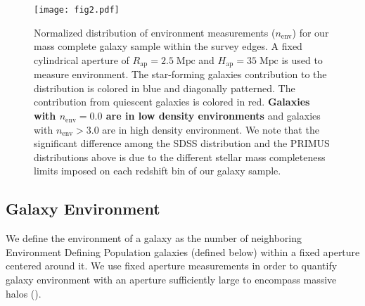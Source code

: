\documentclass{emulateapj}
\def \apradius{2.5}
\def \apheight{35}
\begin{document}
\begin{figure}
  \begin{center}
    \leavevmode
    \texttt{[image: fig2.pdf]}
    \caption{Normalized distribution of environment measurements ($n_{\mathrm{env}}$) for our mass complete galaxy sample within the survey edges. A fixed cylindrical aperture of $R_{\mathrm{ap}} =\apradius\;\mathrm{Mpc}$ and $H_{\mathrm{ap}} = \apheight\; \mathrm{Mpc}$ is used to measure environment. The star-forming galaxies contribution to the distribution is colored in blue and diagonally patterned. The contribution from quiescent galaxies is colored in red. {\bf Galaxies with $n_{\mathrm{env}} = 0.0$ are in low density environments} and galaxies with $n_{\mathrm{env}} > 3.0$ are in high density environment. We note that the significant difference among the SDSS distribution and the PRIMUS distributions above is due to the different stellar mass completeness limits imposed on each redshift bin of our galaxy sample.}      \label{fig:envcount}
    \end{center}
\end{figure}

\subsection{Galaxy Environment} \label{sec:environment}
We define the environment of a galaxy as the number of neighboring Environment Defining Population galaxies (defined below) within a fixed aperture centered around it. We use fixed aperture measurements in order to quantify galaxy environment with an aperture sufficiently large to encompass massive halos (\citealt{Muldrew:2012aa, Skibba:2013aa}).
\end{document}
